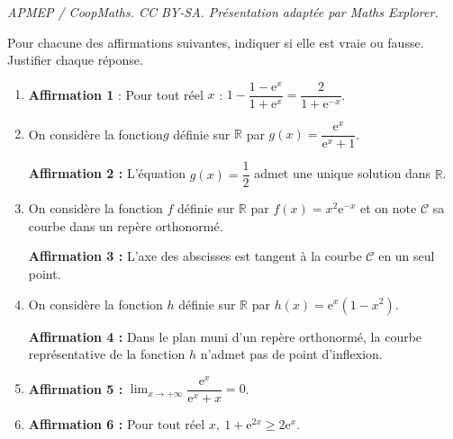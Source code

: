\documentclass[10pt]{article}
\providecommand{\R}{\mathbb{R}}
\begin{document}
\noindent\textit{APMEP / CoopMaths. CC BY-SA. Présentation adaptée par Maths Explorer.}\par\medskip
\medskip

Pour chacune des affirmations suivantes, indiquer si elle est vraie ou fausse. Justifier chaque réponse.

\medskip

\begin{enumerate}
\item \textbf{Affirmation 1} : Pour tout réel $x$  : $1 - \dfrac{1 - \text{e}^x}{1 + \text{e}^x} = \dfrac{2}{1 + \text{e}^{-x}}$.
\item On considère la fonction$g$ définie sur $\R$ par $g(x) = \dfrac{\text{e}^x}{\text{e}^x + 1}$.

\textbf{Affirmation 2 : } L'équation $g(x) = \dfrac12$ admet une unique solution dans $\R$.
\item On considère la fonction $f$ définie sur $\R$ par $f(x) = x^2\text{e}^{-x}$ et on note 
$\mathcal{C}$ sa courbe dans un repère orthonormé.

\textbf{Affirmation 3 : } L'axe des abscisses est tangent à la courbe $\mathcal{C}$ en un seul point.
\item On considère la fonction $h$ définie sur $\R$ par $h(x) = \text{e}^x\left(1 -  x^2\right)$.

\textbf{Affirmation 4 :} Dans le plan muni d'un repère orthonormé, la courbe représentative de la fonction $h$ n'admet pas de point d'inflexion.

\item \textbf{Affirmation 5 :} $\displaystyle\lim_{x \to + \infty} \dfrac{\text{e}^x}{\text{e}^x + x} = 0$.

\item \textbf{Affirmation 6 :} Pour tout réel $x,\: 1 + \text{e}^{2x} \geqslant 2\text{e}^x$.
\end{enumerate}
\end{document}
